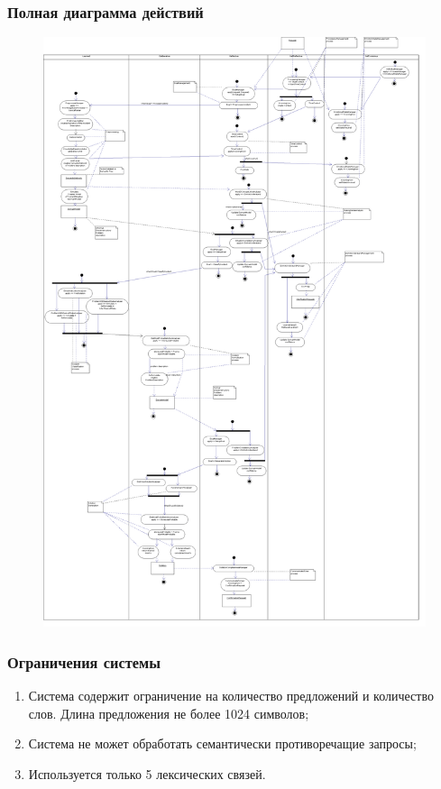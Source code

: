 \documentclass[14pt]{beamer}
\begin{document}
\begin{frame}
\frametitle{Полная диаграмма действий}
\begin{figure} [h] 
  \center
  \includegraphics [scale=0.05] {LifecycleActivity}
  \label{img:LifecycleActivity}  
\end{figure}
\end{frame}

\begin{frame}
\frametitle{Ограничения системы}
\begin{enumerate}
	\item Система содержит ограничение на количество предложений и количество слов. Длина предложения не более 1024 символов;
	\item Система не может обработать семантически противоречащие запросы;
	\item Используется только 5 лексических связей.

\end{enumerate}
\end{frame}
\end{document}

